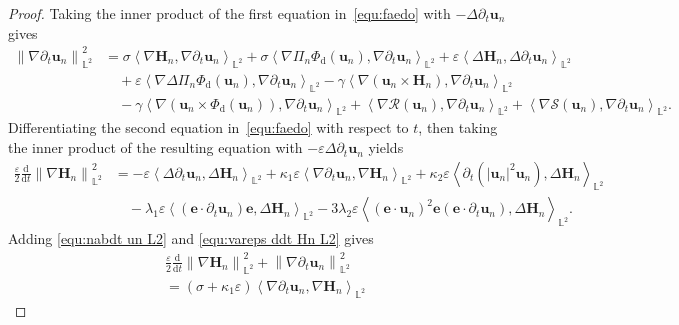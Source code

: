 \documentclass[11pt, reqno]{amsart}
\theoremstyle{definition}
\numberwithin{equation}{section}
\newcommand{\bff}{\boldsymbol}
\newcommand{\bb}{\mathbb}
\newcommand{\ddt}{\frac{\mathrm{d}}{\mathrm{d}t}}
\newcommand{\norm}[2]{\left\|{#1}\right\|_{#2}}
\newcommand{\inpro}[2]{\left\langle#1,#2\right\rangle}
\begin{document}
\begin{proof}
Taking the inner product of the first equation in~\eqref{equ:faedo} with $-\Delta\partial_t \bff{u}_n$ gives
\begin{align}\label{equ:nabdt un L2}
    \norm{\nabla \partial_t \bff{u}_n}{\bb{L}^2}^2
    &=
    \sigma \inpro{\nabla \bff{H}_n}{\nabla \partial_t \bff{u}_n}_{\bb{L}^2}
    +
    \sigma \inpro{\nabla \Pi_n \Phi_{\mathrm{d}}(\bff{u}_n)}{\nabla \partial_t \bff{u}_n}_{\bb{L}^2}
    +
    \varepsilon \inpro{\Delta \bff{H}_n}{\Delta\partial_t \bff{u}_n}_{\bb{L}^2}
    \nonumber \\
    &\quad
    +
    \varepsilon\inpro{\nabla\Delta \Pi_n \Phi_{\mathrm{d}}(\bff{u}_n)}{\nabla \partial_t \bff{u}_n}_{\bb{L}^2}
    -
    \gamma \inpro{\nabla (\bff{u}_n\times\bff{H}_n)}{\nabla\partial_t \bff{u}_n}_{\bb{L}^2}
    \nonumber \\
    &\quad
    -
    \gamma \inpro{\nabla(\bff{u}_n \times \Phi_{\mathrm{d}}(\bff{u}_n))}{\nabla \partial_t \bff{u}_n}_{\bb{L}^2}
    +
    \inpro{\nabla\mathcal{R}(\bff{u}_n)}{\nabla\partial_t \bff{u}_n}_{\bb{L}^2}
    +
    \inpro{\nabla\mathcal{S}(\bff{u}_n)}{\nabla\partial_t \bff{u}_n}_{\bb{L}^2}.
\end{align}
Differentiating the second equation in~\eqref{equ:faedo} with respect to $t$, then taking the inner product of the resulting equation with $-\varepsilon\Delta\partial_t \bff{u}_n$ yields
\begin{align}\label{equ:vareps ddt Hn L2}
    \frac{\varepsilon}{2} \ddt \norm{\nabla \bff{H}_n}{\bb{L}^2}^2
    &=
    -\varepsilon \inpro{\Delta\partial_t \bff{u}_n}{\Delta \bff{H}_n}_{\bb{L}^2}
    +
    \kappa_1 \varepsilon \inpro{\nabla\partial_t \bff{u}_n}{\nabla \bff{H}_n}_{\bb{L}^2}
    +
    \kappa_2 \varepsilon \inpro{\partial_t (|\bff{u}_n|^2 \bff{u}_n)}{\Delta \bff{H}_n}_{\bb{L}^2}
    \nonumber \\
    &\quad
    -
	\lambda_1 \varepsilon\inpro{(\bff{e}\cdot\partial_t \bff{u}_n)\bff{e}}{\Delta \bff{H}_n}_{\bb{L}^2}
    -
    3\lambda_2 \varepsilon \inpro{(\bff{e}\cdot \bff{u}_n)^2 \bff{e}(\bff{e}\cdot \partial_t \bff{u}_n)}{\Delta \bff{H}_n}_{\bb{L}^2}.
\end{align}
Adding \eqref{equ:nabdt un L2} and \eqref{equ:vareps ddt Hn L2} gives
\begin{align}\label{equ:I1 to I9}
    &\frac{\varepsilon}{2} \ddt \norm{\nabla \bff{H}_n}{\bb{L}^2}^2
    +
    \norm{\nabla\partial_t \bff{u}_n}{\bb{L}^2}^2
    \nonumber \\
    &=
    (\sigma+\kappa_1\varepsilon)\inpro{\nabla\partial_t \bff{u}_n}{\nabla \bff{H}_n}_{\bb{L}^2}

\end{align}
\end{proof}
\end{document}
